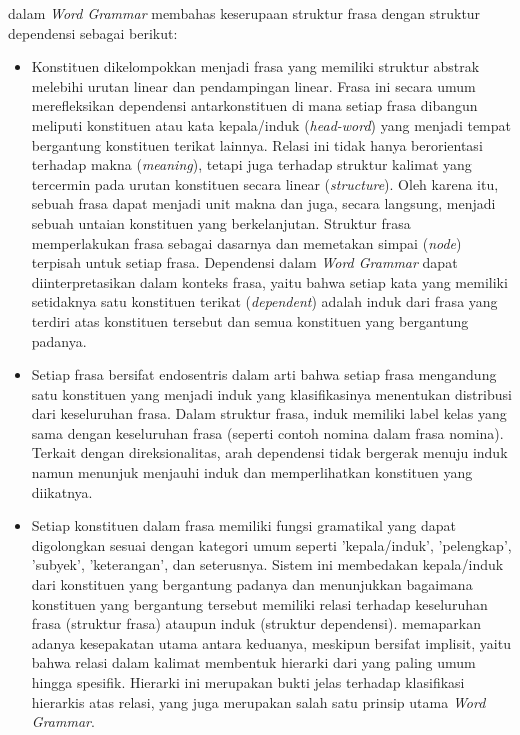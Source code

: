 \cite{hudson2010introduction} dalam \textit{Word Grammar} membahas keserupaan struktur frasa dengan struktur dependensi sebagai berikut:
\begin{itemize}
\item Konstituen dikelompokkan menjadi frasa yang memiliki struktur abstrak melebihi urutan linear dan pendampingan linear. Frasa ini secara umum merefleksikan dependensi antarkonstituen di mana setiap frasa dibangun meliputi konstituen atau kata kepala/induk (\textit{head-word}) yang menjadi tempat bergantung konstituen terikat lainnya. Relasi ini tidak hanya berorientasi terhadap makna (\textit{meaning}), tetapi juga terhadap struktur kalimat yang tercermin pada urutan konstituen secara linear (\textit{structure}). Oleh karena itu, sebuah frasa dapat menjadi unit makna dan juga, secara langsung, menjadi sebuah untaian konstituen yang berkelanjutan. Struktur frasa memperlakukan frasa sebagai dasarnya dan memetakan \gls{simpai} (\textit{node}) terpisah untuk setiap frasa. Dependensi dalam \textit{Word Grammar} dapat diinterpretasikan dalam konteks frasa, yaitu bahwa setiap kata yang memiliki setidaknya satu konstituen terikat (\textit{dependent}) adalah induk dari frasa yang terdiri atas konstituen tersebut dan semua konstituen yang bergantung padanya.
\item Setiap frasa bersifat endosentris dalam arti bahwa setiap frasa mengandung satu konstituen yang menjadi induk yang klasifikasinya menentukan distribusi dari keseluruhan frasa. Dalam struktur frasa, induk memiliki label kelas yang sama dengan keseluruhan frasa (seperti contoh nomina dalam frasa nomina). Terkait dengan direksionalitas, arah dependensi tidak bergerak menuju induk namun menunjuk menjauhi induk dan memperlihatkan konstituen yang diikatnya.
\item Setiap konstituen dalam frasa memiliki fungsi gramatikal yang dapat digolongkan sesuai dengan kategori umum seperti 'kepala/induk', 'pelengkap', 'subyek', 'keterangan', dan seterusnya. Sistem ini membedakan kepala/induk dari konstituen yang bergantung padanya dan menunjukkan bagaimana konstituen yang bergantung tersebut memiliki relasi terhadap keseluruhan frasa (struktur frasa) ataupun induk (struktur dependensi). \cite{hudson2007language} memaparkan adanya kesepakatan utama antara keduanya, meskipun bersifat implisit, yaitu bahwa relasi dalam kalimat membentuk hierarki dari yang paling umum hingga spesifik. Hierarki ini merupakan bukti jelas terhadap klasifikasi hierarkis atas relasi, yang juga merupakan salah satu prinsip utama \textit{Word Grammar}.

\end{itemize}
